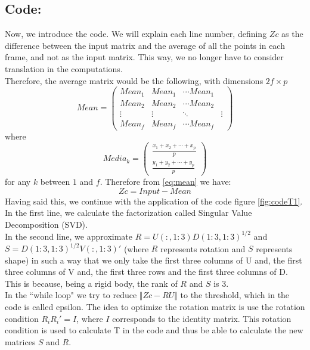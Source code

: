 \subsection{Code:}
\noindent Now, we introduce the code. We will explain each line number, defining $Zc$  as the difference between the input matrix and the average of all the points in each frame, and not as the input matrix.
This way, we no longer have to consider translation in the computations.\\ 
\noindent Therefore, the average matrix would be the following, with dimensions $2f\times p$
\begin{equation}\label{eq:mean}
Mean=
\begin{pmatrix}
Mean_{1} & Mean_{1} & \cdots Mean_{1}\\
Mean_{2} & Mean_{2} & \cdots Mean_{2}\\
\vdots & \vdots & \ddots & \vdots\\
Mean_{f} & Mean_{f} & \cdots Mean_{f}
\end{pmatrix}
\end{equation}
\noindent where
\begin{equation}
Media_{k}=
\begin{pmatrix}
\frac{x_{1} + x_{2} + \cdots + x_{p}}{p}\\
\frac{y_{1} + y_{2} + \cdots + y_{p}}{p}
\end{pmatrix}
\end{equation}
\noindent for any $k$ between $1$ and $f$.
\noindent Therefore from \ref{eq:mean} we have:
\begin{equation}
Zc=Input-Mean
\end{equation}
\noindent Having said this, we continue with the application of the code figure \ref{fig:codeT1}.\\
\noindent In the first line, we calculate the factorization called Singular Value Decomposition (SVD).\\
\noindent In the second line, we approximate $R=U(:,1:3)D(1:3, 1:3)^{1/2}$ and $S=D(1:3, 1:3)^{1/2}V(:, 1:3)'$ (where $R$ represents rotation and $S$ represents shape) in such a way that we only take the first three columns of U and, the first three columns of V and, the first three rows and the first three columns of D. This is because, being a rigid body, the rank of $R$ and $S$ is 3.\\
\noindent In the ``while loop" we try to reduce $\Vert Zc-RU\Vert$  to the threshold, which in the code is called epsilon. The idea to optimize the rotation matrix is use the rotation condition $R_{i}R_{i}'=I$, where $I$ corresponds to the identity matrix. This rotation condition is used to calculate T in the code and thus be able to calculate the new matrices $S$ and $R$.

